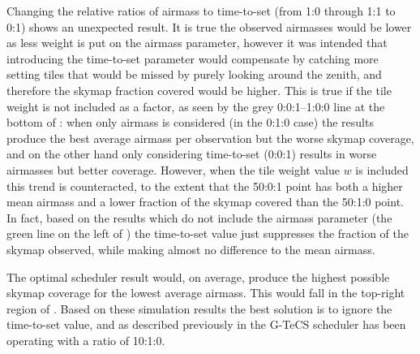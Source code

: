 \begin{colsection}
Changing the relative ratios of airmass to time-to-set (from 1:0 through 1:1 to 0:1) shows an unexpected result. It is true the observed airmasses would be lower as less weight is put on the airmass parameter, however it was intended that introducing the time-to-set parameter would compensate by catching more setting tiles that would be missed by purely looking around the zenith, and therefore the skymap fraction covered would be higher. This is true if the tile weight is not included as a factor, as seen by the grey 0:0:1--1:0:0 line at the bottom of : when only airmass is considered (in the 0:1:0 case) the results produce the best average airmass per observation but the worse skymap coverage, and on the other hand only considering time-to-set (0:0:1) results in worse airmasses but better coverage. However, when the tile weight value $w$ is included this trend is counteracted, to the extent that the 50:0:1 point has both a higher mean airmass and a lower fraction of the skymap covered than the 50:1:0 point. In fact, based on the results which do not include the airmass parameter (the green line on the left of ) the time-to-set value just suppresses the fraction of the skymap observed, while making almost no difference to the mean airmass.

The optimal scheduler result would, on average, produce the highest possible skymap coverage for the lowest average airmass. This would fall in the top-right region of . Based on these simulation results the best solution is to ignore the time-to-set value, and as described previously in  the G-TeCS scheduler has been operating with a ratio of 10:1:0.

\end{colsection}


